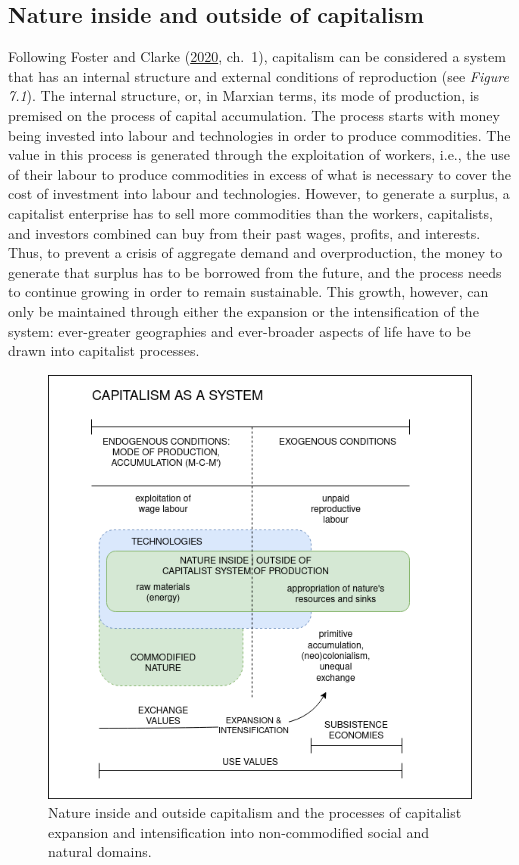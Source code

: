 \documentclass[a4paper, nobind]{templates/ociamthesis}
\begin{document}
\hypertarget{nature-inside-and-outside-of-capitalism}{%
\subsection{Nature inside and outside of capitalism}\label{nature-inside-and-outside-of-capitalism}}

Following Foster and Clarke (\protect\hyperlink{ref-foster_robbery_2020}{2020}, ch.~1), capitalism can be considered a system that has an internal structure and external conditions of reproduction (see \emph{Figure 7.1}). The internal structure, or, in Marxian terms, its mode of production, is premised on the process of capital accumulation. The process starts with money being invested into labour and technologies in order to produce commodities. The value in this process is generated through the exploitation of workers, i.e., the use of their labour to produce commodities in excess of what is necessary to cover the cost of investment into labour and technologies. However, to generate a surplus, a capitalist enterprise has to sell more commodities than the workers, capitalists, and investors combined can buy from their past wages, profits, and interests. Thus, to prevent a crisis of aggregate demand and overproduction, the money to generate that surplus has to be borrowed from the future, and the process needs to continue growing in order to remain sustainable. This growth, however, can only be maintained through either the expansion or the intensification of the system: ever-greater geographies and ever-broader aspects of life have to be drawn into capitalist processes.

\begin{figure}
\includegraphics[width=1\linewidth]{./figures/nature_in_and_outside_capitalism} \caption[Nature inside and outside of capitalism]{Nature inside and outside capitalism and the processes of capitalist expansion and intensification into non-commodified social and natural domains.}\label{fig:unnamed-chunk-9}
\end{figure}
\end{document}
